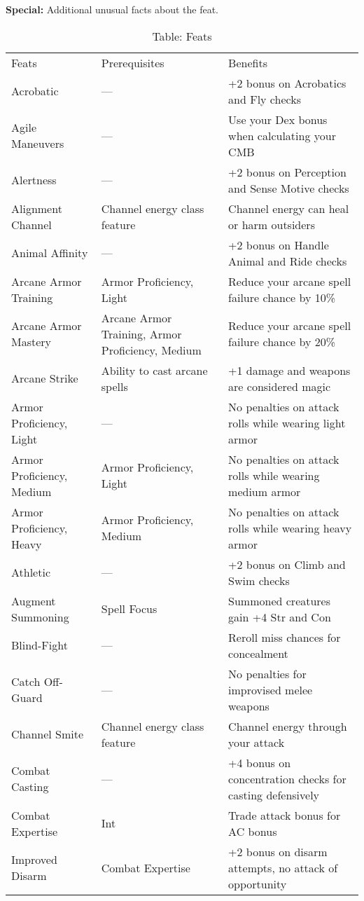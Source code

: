 \textbf{Special:} Additional unusual facts about the feat.
\begin{table}[]
\sffamily
\caption{Table: Feats}
\begin{tabular}{lll}
Feats & Prerequisites & Benefits\\
Acrobatic & — & +2 bonus on Acrobatics and Fly checks \\
Agile Maneuvers & — & Use your Dex bonus when calculating your CMB \\
Alertness & — & +2 bonus on Perception and Sense Motive checks\\
Alignment Channel & Channel energy class feature & Channel energy can heal or harm outsiders\\
Animal Affinity & — & +2 bonus on Handle Animal and Ride checks\\
Arcane Armor Training & Armor Proficiency, Light & Reduce your arcane spell failure chance by 10\%\\
\quad Arcane Armor Mastery & Arcane Armor Training, Armor Proficiency, Medium & Reduce your arcane spell failure chance by 20\%\\
Arcane Strike & Ability to cast arcane spells & +1 damage and weapons are considered magic\\
Armor Proficiency, Light & — & No penalties on attack rolls while wearing light armor\\
\quad Armor Proficiency, Medium & Armor Proficiency, Light & No penalties on attack rolls while wearing medium armor\\
\quad \quad Armor Proficiency, Heavy & Armor Proficiency, Medium & No penalties on attack rolls while wearing heavy armor\\
Athletic & — & +2 bonus on Climb and Swim checks\\
Augment Summoning & Spell Focus & Summoned creatures gain +4 Str and Con\\
Blind-Fight & — & Reroll miss chances for concealment\\
Catch Off-Guard & — & No penalties for improvised melee weapons\\
Channel Smite & Channel energy class feature & Channel energy through your attack\\
Combat Casting & — & +4 bonus on concentration checks for casting defensively\\
Combat Expertise & Int & Trade attack bonus for AC bonus\\
\quad Improved Disarm & Combat Expertise & +2 bonus on disarm attempts, no attack of opportunity\\

\end{tabular}
\end{table}
